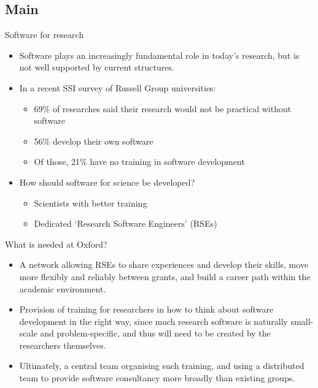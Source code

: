 \documentclass[t,xcolor={usenames,dvipsnames}]{beamer}
\begin{document}
\subsection*{Main}

\begin{frame}{Software for research}
\begin{itemize}
\item Software plays an increasingly fundamental role in today's research, but is not well supported by current structures.
\item In a recent SSI survey of Russell Group universities:
  \begin{itemize}
  \item 69\% of researches said their research would not be practical without software
  \item 56\% develop their own software
  \item Of those, \alert{21\%} have no training in software development
  \end{itemize}
\item How should software for science be developed?
  \begin{itemize}
  \item Scientists with better training
  \item Dedicated `Research Software Engineers' (RSEs)
  \end{itemize}
\end{itemize}
\end{frame}

\begin{frame}{What is needed at Oxford?}
\begin{itemize}
\item A \alert{network} allowing RSEs to share experiences and develop their skills, move more flexibly and reliably between grants, and build a \alert{career path} within the academic environment.
\item Provision of \alert{training for researchers} in how to think about software development in the right way, since much research software is naturally small-scale and problem-specific, and thus will need to be created by the researchers themselves.
\item Ultimately, a central team organising such training, and using a distributed team to provide \alert{software consultancy} more broadly than existing groups.
\end{itemize}
\end{frame}
\end{document}
